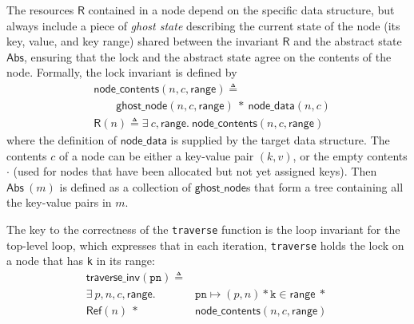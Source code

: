 \documentclass[sigplan,10pt, screen]{acmart}
\newcommand{\treerep}{\ensuremath{\mathsf{Abs}}}
\newcommand{\nodeboxrep}{\ensuremath{\mathsf{Ref }}}
\begin{document}
The resources $\mathsf{R}$ contained in a node depend on the specific data structure, but always include a piece of \emph{ghost state} describing the current state of the node (its key, value, and key range) shared between the invariant $\mathsf{R}$ and the abstract state $\treerep$, ensuring that the lock and the abstract state agree on the contents of the node. Formally, the lock invariant is defined by 
\begin{align*}&\mathsf{node\_contents}(n, c, \mathsf{range}) \triangleq \\ 
	&\qquad\mathsf{ghost\_node}(n, c,\mathsf{range}) \ \ast \ \mathsf{node\_data}(n, c) \\
	&\mathsf{R}(n) \triangleq \exists\ c, \mathsf{range}.\ \mathsf{node\_contents}(n, c, \mathsf{range})\end{align*}
where the definition of $\mathsf{node\_data}$ is supplied by the target data structure. The contents $c$ of a node can be either a key-value pair $(k, v)$, or the empty contents $\cdot$ (used for nodes that have been allocated but not yet assigned keys). Then $\treerep\ (m)$ is defined as a collection of $\mathsf{ghost\_node}$s that form a tree containing all the key-value pairs in $m$.



The key to the correctness of the \texttt{traverse} function is the loop invariant for the top-level loop, which expresses that in each iteration, \lstinline{traverse} holds the lock on a node that has \lstinline{k} in its range:
\begin{align*}\mathsf{traverse\_inv}(\texttt{pn}) \triangleq \\ \exists \ p, n, c, \mathsf{range}.\ &\texttt{pn} \mapsto (p, n) \ast \texttt{k} \in \mathsf{range}\ \ast \ \\  \nodeboxrep(n)  \ \ast \  &\mathsf{node\_contents}(n, c, \mathsf{range})
\end{align*}
\end{document}
